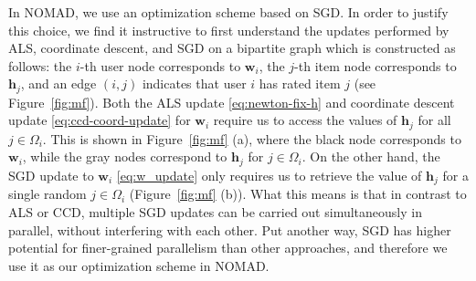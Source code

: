 \documentclass{vldb}
\newcommand{\hb}{\mathbf{h}}
\newcommand{\wb}{\mathbf{w}}
\begin{document}
In NOMAD, we use an optimization scheme based on SGD. In order to
justify this choice, we find it instructive to first understand the
updates performed by ALS, coordinate descent, and SGD on a bipartite
graph which is constructed as follows: the $i$-th user node
corresponds to $\wb_{i}$, the $j$-th item node corresponds to
$\hb_{j}$, and an edge $(i,j)$ indicates that user $i$ has rated item
$j$ (see Figure~\ref{fig:mf}). Both the ALS update
\eqref{eq:newton-fix-h} and coordinate descent update
\eqref{eq:ccd-coord-update} for $\wb_{i}$ require us to access the
values of $\hb_{j}$ for all $j \in \Omega_{i}$. This is shown in
Figure~\ref{fig:mf} (a), where the black node corresponds to
$\wb_{i}$, while the gray nodes correspond to $\hb_{j}$ for $j \in
\Omega_{i}$.  On the other hand, the SGD update to $\wb_{i}$
\eqref{eq:w_update} only requires us to retrieve the value of
$\hb_{j}$ for a single random $j \in \Omega_{i}$ (Figure~\ref{fig:mf}
(b)). What this means is that in contrast to ALS or CCD, multiple SGD
updates can be carried out simultaneously in parallel, without
interfering with each other.  Put another way, SGD has higher
potential for finer-grained parallelism than other approaches, and
therefore we use it as our optimization scheme in NOMAD.
\end{document}

